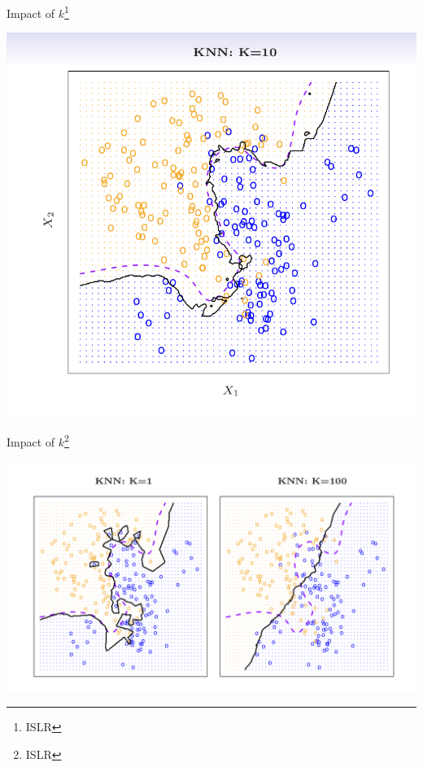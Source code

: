 \documentclass{beamer}
\begin{document}
\begin{frame}{Impact of $k$\footnote{ISLR}}
    \begin{center}
        \includegraphics[scale=0.3]{knnK10.png}
    \end{center}
\end{frame}
\begin{frame}{Impact of $k$\footnote{ISLR}}
    \begin{center}
        \includegraphics[scale=0.3]{knnK1K100.png}
    \end{center}
\end{frame}
\end{document}
